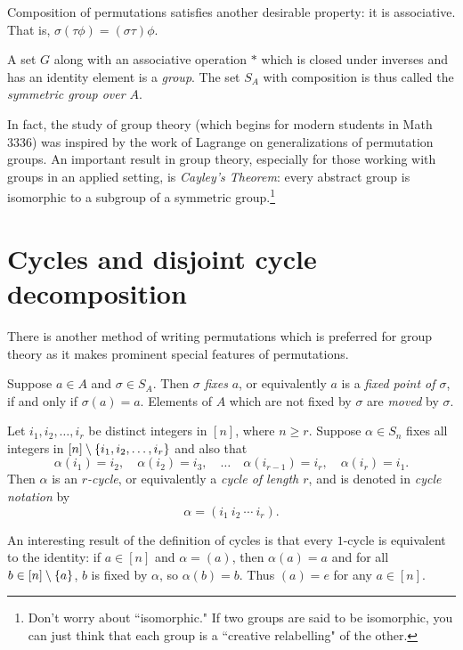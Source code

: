 \documentclass[m3380-lec-main.tex]{subfiles}
\begin{document}
Composition of permutations satisfies another desirable property: it is associative. That is, $\sigma(\tau\phi) = (\sigma\tau)\phi$. 

\begin{defn} A set $G$ along with an associative operation $*$ which is closed under inverses and has an identity element is a \emph{group}. The set $S_A$ with composition is thus called the \emph{symmetric group over $A$}.
\end{defn}

\begin{rem} In fact, the study of group theory (which begins for modern students in Math 3336) was inspired by the work of Lagrange on generalizations of permutation groups. An important result in group theory, especially for those working with groups in an applied setting, is \emph{Cayley's Theorem}: every abstract group is isomorphic to a subgroup of a symmetric group.\footnote{Don't worry about ``isomorphic." If two groups are said to be isomorphic, you can just think that each group is a ``creative relabelling" of the other.}
\end{rem}

\section{Cycles and disjoint cycle decomposition}
There is another method of writing permutations which is preferred for group theory as it makes prominent special features of permutations.
\begin{defn} Suppose $a\in A$ and $\sigma\in S_A$. Then $\sigma$ \emph{fixes} $a$, or equivalently $a$ is a \emph{fixed point of $\sigma$}, if and only if $\sigma(a)=a$. Elements of $A$ which are not fixed by $\sigma$ are \emph{moved} by $\sigma$.
\end{defn}
\begin{defn} Let $i_1, i_2, \ldots, i_r$ be distinct integers in $[n]$, where $n\geq r$. Suppose $\alpha\in S_n$ fixes all integers in $[n]\setminus\left\{i_1,i_2,\ldots,i_r\right\}$ and also that
\[\alpha(i_1)=i_2,\quad \alpha(i_2)=i_3,\quad \ldots\quad \alpha(i_{r-1})=i_r,\quad \alpha(i_r)=i_1.\]
Then $\alpha$ is an \emph{$r$-cycle}, or equivalently a \emph{cycle of length $r$}, and is denoted in \emph{cycle notation} by 
\[\alpha = (i_1~i_2~\cdots~i_r).\]
\end{defn}
An interesting result of the definition of cycles is that every $1$-cycle is equivalent to the identity: if $a\in[n]$ and $\alpha=(a)$, then $\alpha(a) = a$ and for all $b\in[n]\setminus\left\{a\right\}$, $b$ is fixed by $\alpha$, so $\alpha(b)=b$. Thus $(a)=e$ for any $a\in[n]$.
\end{document}
